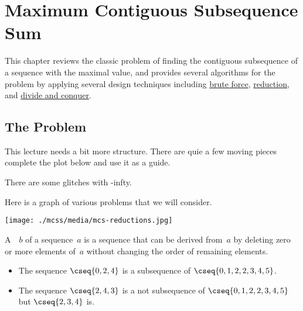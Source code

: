 \newcommand{\MCS}{\textsf{MCS}}
\newcommand{\MCSS}{\textsf{MCSS}}
\newcommand{\MCSSE}{\textsf{MCSSE}}
\newcommand{\MCSSS}{\textsf{MCSSS}}
\newcommand{\MCSSPS}{\textsf{MCSSPS}}
\newcommand{\mcsss}[2]{\mbox{\texttt{AlgoMCSSS}}(#1,#2)}

\chapter{Maximum Contiguous Subsequence Sum}
\label{ch:mcss}

\begin{preamble}
This chapter reviews the classic problem of finding the contiguous
subsequence of a sequence with the maximal value, 
%
and provides several algorithms for the problem by applying several design techniques including
\href{sec:design::bf}{brute force},
%
\href{sec:design::reduction}{reduction}, and
%
\href{ch:design::dc}{divide and conquer}.
%

\end{preamble}


\section{The Problem}
\label{ch:mcss::problem}

\begin{teachnote}
This lecture needs a bit more structure.  There are quie a few moving
pieces complete the plot below and use it as a guide.  

There are some glitches with -infty.  
\end{teachnote}

\begin{teachnote}

Here is a graph of various problems that we will consider.

\texttt{[image: ./mcss/media/mcs-reductions.jpg]}

\end{teachnote}

\begin{flex}
\begin{definition}[Subsequence]
\label{def:mcss::introduction::subseq}

A~~$b$ of a sequence~$a$ is a sequence that can be
derived from~$a$ by deleting zero or more elements of~$a$ without changing the
order of remaining elements. 
%
\end{definition}

\begin{example}
\begin{itemize}

\item
The sequence $\cseq{0,2,4}$ is a subsequence of
$\cseq{0,1,2,2,3,4,5}$.

\item
The sequence $\cseq{2,4,3}$ is a not
subsequence of $\cseq{0,1,2,2,3,4,5}$ but $\cseq{2,3,4}$ is.
\end{itemize}
%
\end{example}
\end{flex}

